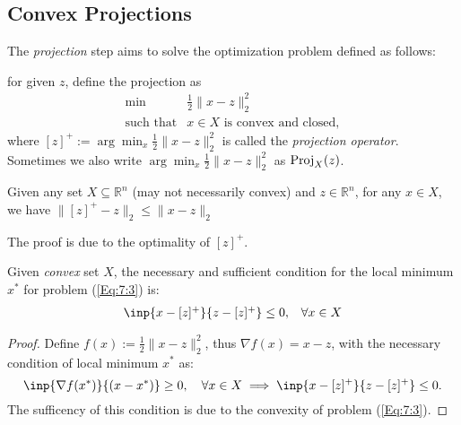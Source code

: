 \subsection{Convex Projections}
The \emph{projection} step aims to solve the optimization problem defined as follows: 
\begin{definition}[Projection]
for given $z$, define the projection as
\begin{equation}\label{Eq:7:3}
\begin{array}{ll}
\min&\frac{1}{2}\|x-z\|_2^2\\
\mbox{such that}&x\in X\mbox{ is convex and closed},
\end{array}
\end{equation}
where $[z]^+:=\arg\min_{x}\frac{1}{2}\|x-z\|_2^2$ is called the \emph{projection operator}. Sometimes we also write $\arg\min_{x}\frac{1}{2}\|x-z\|_2^2$ as $\operatorname{Proj}_{X}(z)$. 
\end{definition}
\begin{proposition}
Given any set $X\subseteq\mathbb{R}^n$ (may not necessarily convex) and $z\in\mathbb{R}^n$, for any $x\in X$, we have $\|[z]^+-z\|_2\le\|x-z\|_2$
\end{proposition}
The proof is due to the optimality of $[z]^+$.
\begin{proposition}
Given \emph{convex} set $X$, the necessary and sufficient condition for the local minimum $x^*$ for problem (\ref{Eq:7:3}) is:
\begin{equation}\label{Eq:7:4}
\begin{array}{ll}
\inp{x-[z]^+}{z-[z]^+}\le0,&\forall x\in X
\end{array}
\end{equation}
\end{proposition}
\begin{proof}
Define $f(x):=\frac{1}{2}\|x-z\|_2^2$, thus $\nabla f(x)=x-z$, with the necessary condition of local minimum $x^*$ as:
\[
\inp{\nabla f(x^*)}{(x-x^*)}\ge0,\quad\forall x\in X\implies
\inp{x-[z]^+}{z-[z]^+}\le0.
\]
The sufficency of this condition is due to the convexity of problem (\ref{Eq:7:3}).
\end{proof}

